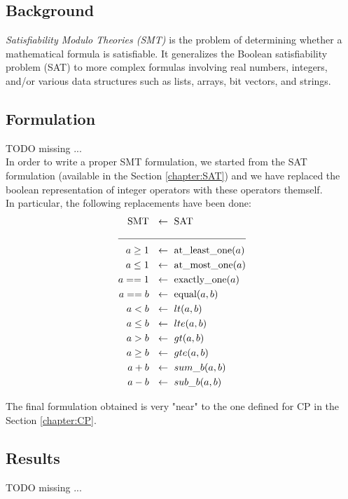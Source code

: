 
\subsection{Background}
    \textit{Satisfiability Modulo Theories (SMT)} is the problem of determining whether a
    mathematical formula is satisfiable. It generalizes the Boolean satisfiability problem (SAT) to
    more complex formulas involving real numbers, integers, and/or various data structures such as 
    lists, arrays, bit vectors, and strings.


\subsection{Formulation}
    \colorbox{BurntOrange}{TODO missing ...} \\

    In order to write a proper SMT formulation, we started from the SAT formulation (available in
    the Section \ref*{chapter:SAT}) and we have replaced the boolean representation of integer 
    operators with these operators themself.\\

    In particular, the following replacements have been done:
    \begin{align*}
      \text{SMT} \ &\ \leftarrow\ \text{SAT}      \\
                 \cline{1-2}
        a \geq 1 \ &\ \leftarrow\ \text{at\_least\_one}(a) \\
        a \leq 1 \ &\ \leftarrow\ \text{at\_most\_one}(a)  \\
          a == 1 \ &\ \leftarrow\ \text{exactly\_one}(a)   \\
          a == b \ &\ \leftarrow\ \text{equal}(a,b)        \\
           a < b \ &\ \leftarrow\ lt(a,b)                  \\
        a \leq b \ &\ \leftarrow\ lte(a,b)                 \\
           a > b \ &\ \leftarrow\ gt(a,b)                  \\
        a \geq b \ &\ \leftarrow\ gte(a,b)                 \\
           a + b \ &\ \leftarrow\ sum\_b(a,b)              \\   
           a - b \ &\ \leftarrow\ sub\_b(a,b)                 
    \end{align*}

    The final formulation obtained is very "near" to the one defined for CP in the
    Section \ref{chapter:CP}.


\subsection{Results}
    \colorbox{BurntOrange}{TODO missing ...} \\
